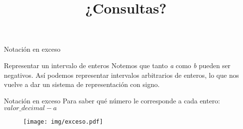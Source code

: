 \documentclass[11pt,a4paper,spanish]{beamer}
\begin{document}
\begin{frame}{Notación en exceso}
    \begin{block}{Representar un intervalo de enteros}
    Notemos que tanto \textit{a} como \textit{b} pueden ser negativos. Así podemos representar intervalos arbitrarios de enteros, lo que nos vuelve a dar un sistema de representación con signo.
    \end{block}
\end{frame}

\begin{frame}{Notación en exceso}
\small Para saber qué número le corresponde a cada entero: $valor\_decimal - a$ 
    \begin{figure}
    \centering
    \texttt{[image: img/exceso.pdf]}
    \captionsetup{labelformat=empty}
    \caption{}
\end{figure}

\end{frame}


\begin{frame}

\title{¿Consultas?}
\maketitle

\end{frame}

\setcounter{lastPage}{\number\value{page}}

\setcounter{page}{\number\value{lastPage}}
\end{document}
